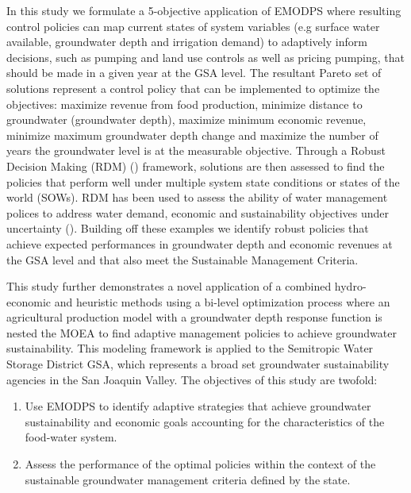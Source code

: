 \documentclass[a4paper,fleqn]{cas-sc}
\begin{document}
In this study we formulate a 5-objective application of EMODPS where resulting control policies can map current states of system variables (e.g surface water available, groundwater depth and irrigation demand) to adaptively inform decisions, such as pumping and land use controls as well as pricing pumping, that should be made in a given year at the GSA level. The resultant Pareto set of solutions represent a control policy that can be implemented to optimize the objectives: maximize revenue from food production, minimize distance to groundwater (groundwater depth), maximize minimum economic revenue, minimize maximum groundwater depth change and maximize the number of years the groundwater level is at the measurable objective. Through a Robust Decision Making (RDM) (\citep{groves_robust_2019,lempert_making_2013}) framework, solutions are then assessed to find the policies that perform well under multiple system state conditions or states of the world (SOWs). RDM has been used to assess the ability of water management polices to address water demand, economic and sustainability objectives under uncertainty (\citep{graveline_combining_2020,huskova_screening_2016,miro_adaptive_2021,hadjimichael_defining_2020,shuai_robust_2022}). Building off these examples we identify robust policies that achieve expected performances in groundwater depth and economic revenues at the GSA level and that also meet the Sustainable Management Criteria. 

This study further demonstrates a novel application of a combined hydro-economic and heuristic methods using a bi-level optimization process where an agricultural production model with a groundwater depth response function is nested the MOEA to find adaptive management policies to achieve groundwater sustainability. This modeling framework is applied to the Semitropic Water Storage District GSA, which represents a broad set groundwater sustainability agencies in the San Joaquin Valley. The objectives of this study are twofold:  

\begin{enumerate}
    \item  Use EMODPS to identify adaptive strategies that achieve groundwater sustainability and economic goals accounting for the characteristics of the food-water system. 
    
    \item Assess the performance of the optimal policies within the context of the sustainable groundwater management criteria defined by the state.
\end{enumerate}
\end{document}
